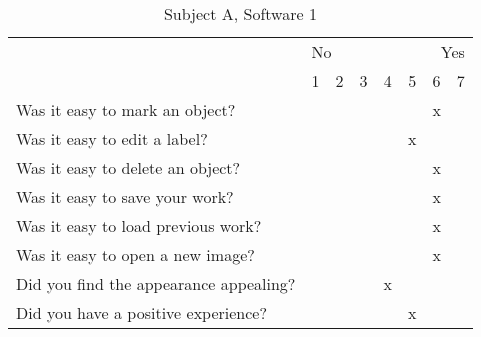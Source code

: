 \documentclass[a4paper,11pt,oneside]{article}
\begin{document}
\begin{table}[h]

\centering
\caption{Subject A, Software 1}

\vspace{10px}
\begin{tabular}{ p{7cm} | c | c | c | c | c | c | c | }
    \cline{2-8}
     & \multicolumn{3}{|l}{No} & \multicolumn{1}{c}{ } & \multicolumn{3}{r|}{Yes} \\
    \cline{2-8}
      & 1 & 2 & 3 & 4 & 5 & 6 & 7 \\
    \hline
    \multicolumn{1}{|l|}{Was it easy to mark an object?} & & & & & & x & \\
    \hline
    \multicolumn{1}{|l|}{Was it easy to edit a label?} & & & & & x & & \\
    \hline
    \multicolumn{1}{|l|}{Was it easy to delete an object?} & & & & & & x & \\
    \hline
    \multicolumn{1}{|l|}{Was it easy to save your work?} & & & & & & x & \\
    \hline
    \multicolumn{1}{|l|}{Was it easy to load previous work?} & & & & & & x & \\
    \hline
    \multicolumn{1}{|l|}{Was it easy to open a new image?} & & & & & & x & \\
    \hline
    \multicolumn{1}{|l|}{Did you find the appearance appealing?} & & & & x & & & \\
    \hline
    \multicolumn{1}{|l|}{Did you have a positive experience?} & & & & & x & & \\
    \hline
\end{tabular} 
\label{tab:a1}
\end{table}
\end{document}
